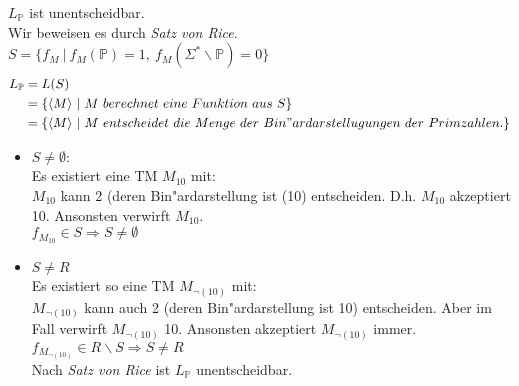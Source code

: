 \documentclass[a4paper,11pt]{scrartcl}
\begin{document}
$L_{\mathbb{P}}$ ist unentscheidbar.\\
Wir beweisen es durch \textit{Satz von Rice}.\\
$S =\{ f_M\ |\ f_M(\mathbb{P}) = 1,\ f_M(\Sigma^*\backslash \mathbb{P})=0\}$
\begin{align*}
	L_{\mathbb{P}} &= L(S)\\
	&= \{\langle M\rangle \ |\ M\ berechnet\ eine\ Funktion\ aus\ S\}\\
	&= \{\langle M\rangle \ |\ M\  entscheidet\ die\ Menge\ der\ Bin"ardarstellugungen\ der\ Primzahlen. \}
\end{align*}
\begin{itemize}
	\item 
	$S \ne \emptyset :$\\
	Es existiert eine TM $M_{10}$ mit:\\
	$M_{10}$ kann 2 (deren Bin"ardarstellung ist (10) entscheiden. D.h. $M_{10}$ akzeptiert 10. Ansonsten verwirft $M_{10}$.\\
	$f_{M_{10}} \in S \Longrightarrow S \ne \emptyset$
	
	\item
	$S \ne R$\\
	Es existiert so eine TM $M_{\neg (10)}$ mit:\\
	$M_{\neg (10)}$ kann auch 2 (deren Bin"ardarstellung ist 10) entscheiden. Aber im Fall verwirft $M_{\neg (10)}$ 10. Ansonsten akzeptiert $M_{\neg (10)}$ immer.\\
	$f_{M_{\neg (10)}} \in R\backslash S \Longrightarrow S \ne R$\\
	
	Nach \textit{Satz von Rice} ist $L_{\mathbb{P}}$ unentscheidbar.
		
\end{itemize}
\end{document}
